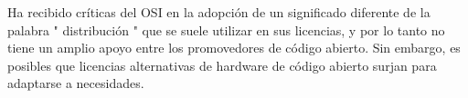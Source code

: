 
Ha recibido críticas del OSI en la adopción de un significado diferente de la  palabra " distribución " que se suele utilizar en sus licencias, y por lo tanto no tiene un amplio apoyo entre los promovedores de código abierto\cite{Etiqueta13}. 
Sin embargo, es posibles que licencias alternativas de hardware de código abierto surjan para adaptarse a necesidades.










